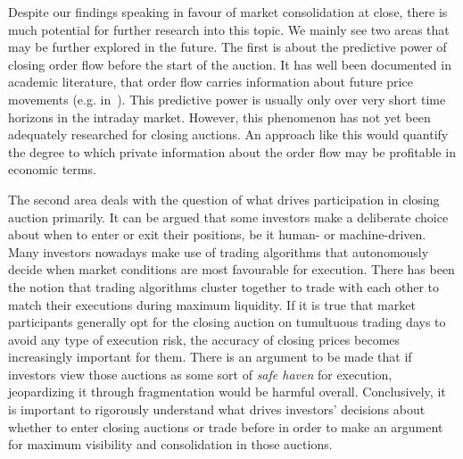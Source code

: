 \documentclass[11pt,a4paper, notitlepage]{article}
\begin{document}
	Despite our findings speaking in favour of market consolidation at close, there is much potential for further research into this topic. We mainly see two areas that may be further explored in the future. The first is about the predictive power of closing order flow before the start of the auction. It has well been documented in academic literature, that order flow carries information about future price movements (e.g. in~\textcite{ChordiaRollSubrahmanyam2005,ChordiaRollSubrahmanyam2008}). This predictive power is usually only over very short time horizons in the intraday market. However, this phenomenon has not yet been adequately researched for closing auctions. An approach like this would quantify the degree to which private information about the order flow may be profitable in economic terms.
	
	The second area deals with the question of what drives participation in closing auction primarily. It can be argued that some investors make a deliberate choice about when to enter or exit their positions, be it human- or machine-driven. Many investors nowadays make use of trading algorithms that autonomously decide when market conditions are most favourable for execution. There has been the notion that trading algorithms cluster together to trade with each other to match their executions during maximum liquidity. If it is true that market participants generally opt for the closing auction on tumultuous trading days to avoid any type of execution risk, the accuracy of closing prices becomes increasingly important for them. There is an argument to be made that if investors view those auctions as some sort of \emph{safe haven} for execution, jeopardizing it through fragmentation would be harmful overall. Conclusively, it is important to rigorously understand what drives investors' decisions about whether to enter closing auctions or trade before in order to make an argument for maximum visibility and consolidation in those auctions.
	
	\clearpage
	
	\printbibliography[heading=bibintoc]
\end{document}
